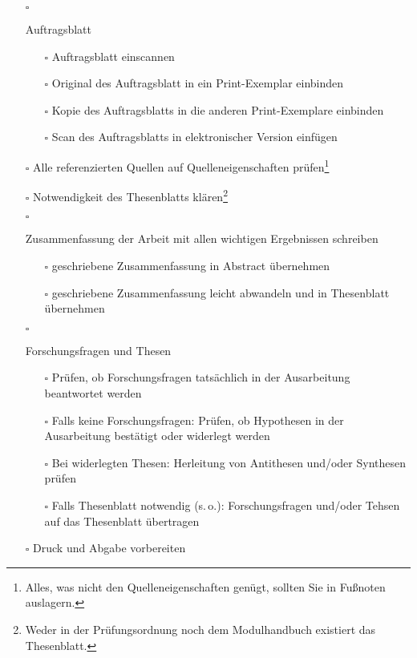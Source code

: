 \begin{itemize}
{    }
    \item[$\square$]{
        Auftragsblatt
        \begin{itemize}
            \item[$\square$] Auftragsblatt einscannen
            \item[$\square$] Original des Auftragsblatt in ein Print-Exemplar einbinden
            \item[$\square$] Kopie des Auftragsblatts in die anderen Print-Exemplare einbinden
            \item[$\square$] Scan des Auftragsblatts in elektronischer Version einfügen
        \end{itemize}
    }
    \item[$\square$] Alle referenzierten Quellen auf Quelleneigenschaften prüfen\footnote{Alles, was nicht den Quelleneigenschaften genügt, sollten Sie in Fußnoten auslagern.}
    \item[$\square$] Notwendigkeit des Thesenblatts klären\footnote{Weder in der Prüfungsordnung noch dem Modulhandbuch existiert das Thesenblatt.}
    \item[$\square$]{
        Zusammenfassung der Arbeit mit allen wichtigen Ergebnissen schreiben
        \begin{itemize}
            \item[$\square$] geschriebene Zusammenfassung in Abstract übernehmen
            \item[$\square$] geschriebene Zusammenfassung leicht abwandeln und in Thesenblatt übernehmen
        \end{itemize}
    }
    \item[$\square$]{
        Forschungsfragen und Thesen
        \begin{itemize}
            \item[$\square$] Prüfen, ob Forschungsfragen tatsächlich in der Ausarbeitung beantwortet werden
            \item[$\square$] Falls keine Forschungsfragen: Prüfen, ob Hypothesen in der Ausarbeitung bestätigt oder widerlegt werden
            \item[$\square$] Bei widerlegten Thesen: Herleitung von Antithesen und/oder Synthesen prüfen
            \item[$\square$] Falls Thesenblatt notwendig (s.\,o.):  Forschungsfragen und/oder Tehsen auf das Thesenblatt übertragen
        \end{itemize}
    }
    \clearpage
    \item[$\square$]{
        Druck und Abgabe vorbereiten
}
\end{itemize}

